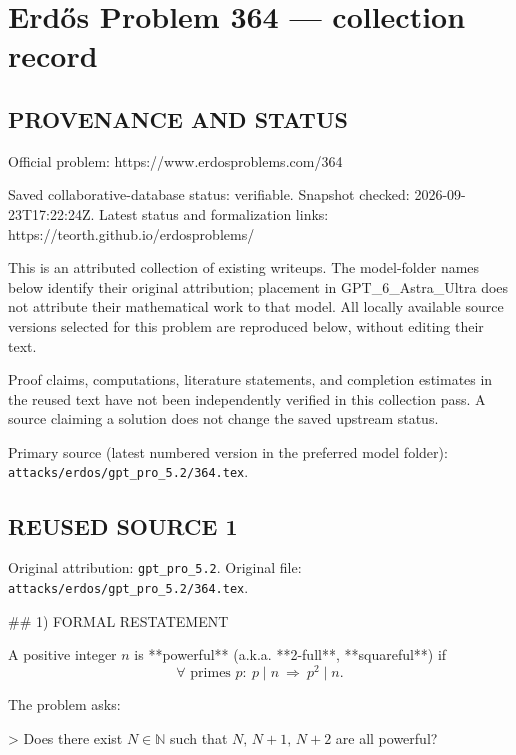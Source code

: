 \section*{Erd\H{o}s Problem 364 --- collection record}

\subsection*{PROVENANCE AND STATUS}
Official problem: https://www.erdosproblems.com/364

Saved collaborative-database status: verifiable.
Snapshot checked: 2026-09-23T17:22:24Z.
Latest status and formalization links: https://teorth.github.io/erdosproblems/

This is an attributed collection of existing writeups. The model-folder names below identify their original attribution; placement in GPT\_6\_Astra\_Ultra does not attribute their mathematical work to that model. All locally available source versions selected for this problem are reproduced below, without editing their text.

Proof claims, computations, literature statements, and completion estimates in the reused text have not been independently verified in this collection pass. A source claiming a solution does not change the saved upstream status.

Primary source (latest numbered version in the preferred model folder): \texttt{attacks/erdos/gpt\_pro\_5.2/364.tex}.

\subsection*{REUSED SOURCE 1}
Original attribution: \texttt{gpt\_pro\_5.2}.
Original file: \texttt{attacks/erdos/gpt\_pro\_5.2/364.tex}.


## 1) FORMAL RESTATEMENT

A positive integer \(n\) is **powerful** (a.k.a. **2-full**, **squareful**) if
\[
\forall\text{ primes }p:\ p\mid n\ \Rightarrow\ p^2\mid n.
\]

The problem asks:

> Does there exist \(N\in\mathbb N\) such that \(N,\,N+1,\,N+2\) are all powerful?

